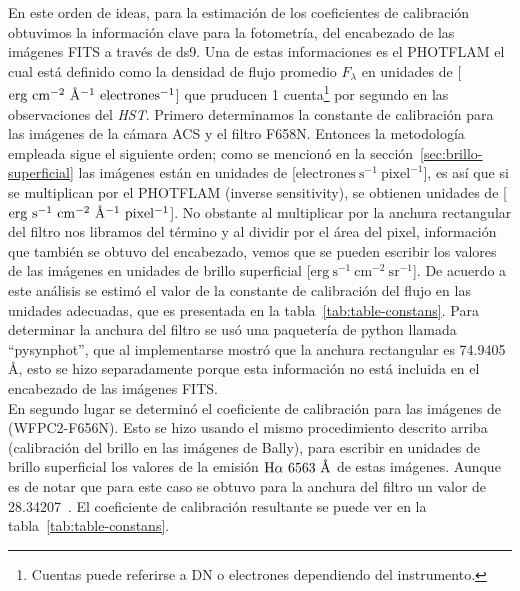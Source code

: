 En este orden de ideas, para la estimación de los coeficientes de calibración obtuvimos la información clave para la fotometría, del encabezado de las imágenes FITS a través de ds9. Una de estas informaciones es el PHOTFLAM el cual está definido como la densidad de flujo promedio \(F_{\lambda}\) en unidades de [\(\mathrm{erg~cm^{-2}~\text{\AA{}}{}^{-1}~electrones^{-1}}\)] que pruducen 1 cuenta\footnote{Cuentas puede referirse a DN o electrones dependiendo del instrumento.} por segundo en las observaciones del \textit{HST}. Primero determinamos la constante de calibración para las imágenes de la cámara ACS y el filtro F658N. Entonces la metodología empleada sigue el siguiente orden; como se mencionó en la sección~\ref{sec:brillo-superficial} las imágenes están en unidades de [\(\mathrm{electrones~s^{-1}~pixel^{-1}}\)], es así que si se multiplican por el PHOTFLAM (inverse sensitivity), se obtienen unidades de [\(\mathrm{erg\ s^{-1}~cm^{-2}~\A{}^{-1}~pixel^{-1}}\)]. No obstante al multiplicar por la anchura rectangular del filtro nos libramos del término \A{} y al dividir por el área del pixel, información que también se obtuvo del encabezado, vemos que se pueden escribir los valores de las imágenes en unidades de brillo superficial [\(\mathrm{erg~s^{-1}~cm^{-2}~sr^{-1}}\)]. De acuerdo a este análisis se estimó el valor de la constante de calibración del flujo en las unidades adecuadas, que es presentada en la tabla~\ref{tab:table-constans}. Para determinar la anchura del filtro se usó una paquetería de python llamada ``pysynphot'', que al implementarse mostró que la anchura rectangular es 74.9405 \(\text{\AA{}}\), esto se hizo separadamente porque esta información no está incluida en el encabezado de las imágenes FITS.\\

En segundo lugar se determinó el coeficiente de calibración  para las imágenes de \citet{Robberto:2013a} (WFPC2-F656N). Esto se hizo usando el mismo procedimiento descrito arriba (calibración del brillo en las imágenes de Bally), para escribir en unidades de brillo superficial los valores de la emisión \(\mathrm{H}\alpha{}~6563~\text{\AA{}}{}\) de estas imágenes. Aunque es de notar que para este caso se obtuvo para la anchura del filtro un valor de 28.34207~\A{}. El coeficiente de calibración resultante se puede ver en la tabla~\ref{tab:table-constans}.\\


